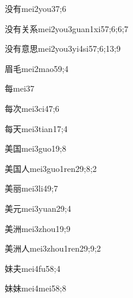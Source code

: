 \begin{verbete}{没有}{mei2you3}{7;6}
\end{verbete}
\begin{verbete}{没有关系}{mei2you3guan1xi5}{7;6;6;7}
\end{verbete}
\begin{verbete}{没有意思}{mei2you3yi4si5}{7;6;13;9}
\end{verbete}
\begin{verbete}{眉毛}{mei2mao5}{9;4}
\end{verbete}
\begin{verbete}{每}{mei3}{7}
\end{verbete}
\begin{verbete}{每次}{mei3ci4}{7;6}
\end{verbete}
\begin{verbete}{每天}{mei3tian1}{7;4}
\end{verbete}
\begin{verbete}{美国}{mei3guo1}{9;8}
\end{verbete}
\begin{verbete}{美国人}{mei3guo1ren2}{9;8;2}
\end{verbete}
\begin{verbete}{美丽}{mei3li4}{9;7}
\end{verbete}
\begin{verbete}{美元}{mei3yuan2}{9;4}
\end{verbete}
\begin{verbete}{美洲}{mei3zhou1}{9;9}
\end{verbete}
\begin{verbete}{美洲人}{mei3zhou1ren2}{9;9;2}
\end{verbete}
\begin{verbete}{妹夫}{mei4fu5}{8;4}
\end{verbete}
\begin{verbete}{妹妹}{mei4mei5}{8;8}
\end{verbete}
